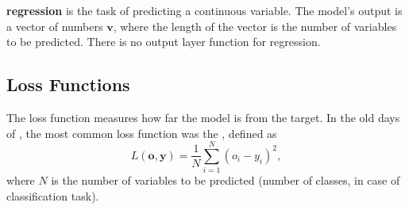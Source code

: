 \textbf{regression} is the task of predicting a continuous variable.
The model's output is a vector of numbers $\pmb{v}$, where the length of the vector is the number of variables to be predicted.
There is no output layer function for regression.


\subsection{Loss Functions}
\label{sec:loss_functions}
The loss function measures how far the model is from the target.
In the old days of \ml, the most common loss function was the \MSE, defined as 
\begin{equation}
    \label{eq:MSE}
    L(\pmb{o},\pmb{y}) = \frac{1}{N} \sum_{i=1}^N (o_i - y_i)^2,
\end{equation}
where $N$ is the number of variables to be predicted (number of classes, in case of classification task).


